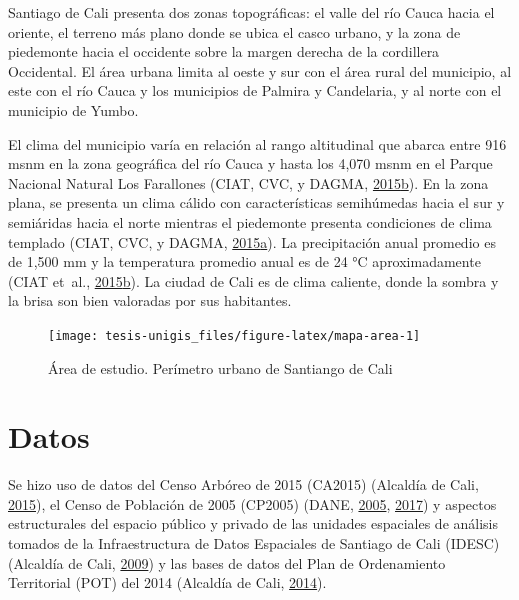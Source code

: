 \documentclass[12pt,a4paper,openany]{book}
\theoremstyle{definition}
\theoremstyle{definition}
\theoremstyle{definition}
\theoremstyle{remark}
\begin{document}
Santiago de Cali presenta dos zonas topográficas: el valle del río Cauca
hacia el oriente, el terreno más plano donde se ubica el casco urbano, y
la zona de piedemonte hacia el occidente sobre la margen derecha de la
cordillera Occidental. El área urbana limita al oeste y sur con el área
rural del municipio, al este con el río Cauca y los municipios de
Palmira y Candelaria, y al norte con el municipio de Yumbo.

El clima del municipio varía en relación al rango altitudinal que abarca
entre 916 msnm en la zona geográfica del río Cauca y hasta los 4,070
msnm en el Parque Nacional Natural Los Farallones (CIAT, CVC, y DAGMA,
\protect\hyperlink{ref-ciat_plan_2015}{2015}\protect\hyperlink{ref-ciat_plan_2015}{b}).
En la zona plana, se presenta un clima cálido con características
semihúmedas hacia el sur y semiáridas hacia el norte mientras el
piedemonte presenta condiciones de clima templado (CIAT, CVC, y DAGMA,
\protect\hyperlink{ref-ciat_microzona_2015}{2015}\protect\hyperlink{ref-ciat_microzona_2015}{a}).
La precipitación anual promedio es de 1,500 mm y la temperatura promedio
anual es de 24 °C aproximadamente (CIAT et~al.,
\protect\hyperlink{ref-ciat_plan_2015}{2015}\protect\hyperlink{ref-ciat_plan_2015}{b}).
La ciudad de Cali es de clima caliente, donde la sombra y la brisa son
bien valoradas por sus habitantes.

\begin{figure}[H]

{\centering \texttt{[image: tesis-unigis\_files/figure-latex/mapa-area-1]} 

}

\caption{Área de estudio. Perímetro urbano de Santiango de Cali}\label{fig:mapa-area}
\end{figure}

\section{Datos}\label{datos}

Se hizo uso de datos del Censo Arbóreo de 2015 (CA2015) (Alcaldía de
Cali, \protect\hyperlink{ref-ca2015cali}{2015}), el Censo de Población
de 2005 (CP2005) (DANE,
\protect\hyperlink{ref-censo_sistema_dane}{2005},
\protect\hyperlink{ref-geoportal_DANE}{2017}) y aspectos estructurales
del espacio público y privado de las unidades espaciales de análisis
tomados de la Infraestructura de Datos Espaciales de Santiago de Cali
(IDESC) (Alcaldía de Cali,
\protect\hyperlink{ref-geoportal_idesc}{2009}) y las bases de datos del
Plan de Ordenamiento Territorial (POT) del 2014 (Alcaldía de Cali,
\protect\hyperlink{ref-pot2014cali}{2014}).
\end{document}
